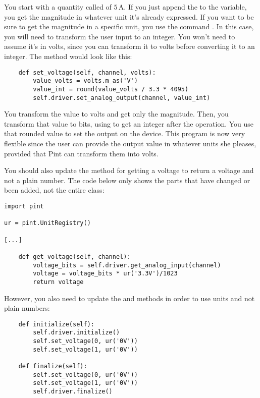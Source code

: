 You start with a quantity called  of $5\,\textrm{A}$. If you just append the  to the variable, you get the magnitude in whatever unit it's already expressed. If you want to be sure to get the magnitude in a specific unit, you use the command . In this case, you will need to transform the user input to an integer. You won't need to assume it's in volts, since you can transform it to volts before converting it to an integer. The  method would look like this:

\begin{verbatim}
    def set_voltage(self, channel, volts):
        value_volts = volts.m_as('V')
        value_int = round(value_volts / 3.3 * 4095)
        self.driver.set_analog_output(channel, value_int)
\end{verbatim}

You transform the value to volts and get only the magnitude. Then, you transform that value to bits, using  to get an integer after the operation. You use that rounded value to set the output on the device. This program is now very flexible since the user can provide the output value in whatever units she pleases, provided that Pint can transform them into volts.


You should also update the method for getting a voltage to return a voltage and not a plain number. The code below only shows the parts that have changed or been added, not the entire class:

\begin{verbatim}
import pint

ur = pint.UnitRegistry()

[...]

    def get_voltage(self, channel):
        voltage_bits = self.driver.get_analog_input(channel)
        voltage = voltage_bits * ur('3.3V')/1023
        return voltage
\end{verbatim}

However, you also need to update the  and  methods in order to use units and not plain numbers:

\begin{verbatim}
    def initialize(self):
        self.driver.initialize()
        self.set_voltage(0, ur('0V'))
        self.set_voltage(1, ur('0V'))

    def finalize(self):
        self.set_voltage(0, ur('0V'))
        self.set_voltage(1, ur('0V'))
        self.driver.finalize()
\end{verbatim}

